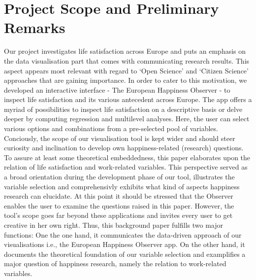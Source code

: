\documentclass[preprint,12pt,authoryear]{elsarticle}
\begin{document}
	\newpage
	\tableofcontents
	\newpage
	
	
	\section{Project Scope and Preliminary Remarks}
	Our project investigates life satisfaction across Europe and puts an emphasis on the data visualisation part that comes
	with communicating research results. This aspect appears most relevant with regard to `Open Science' and `Citizen
	Science' approaches that are gaining importance. In order to cater to this motivation, we developed an interactive interface
	- The European Happiness Observer - to inspect life satisfaction and its various antecedent across Europe. The app offers
	a myriad of possibilities to inspect life satisfaction on a descriptive basis or delve deeper by computing regression and multilevel
	analyses. Here, the user can select various options and combinations from a pre-selected pool of variables. \\
	Conciously, the scope of our visualisation tool is kept wider and should steer curiosity and inclination to develop own 
	happiness-related (research) questions. To assure at least some theoretical embeddedness, this paper elaborates upon the
	relation of life satisfaction and work-related variables. This perspective served as a broad orientation during the development
	phase of our tool, illustrates the variable selection and comprehensivly exhibits what kind of aspects happiness research
	can elucidate. At this point it should be stressed that the Observer enables the user to examine the questions raised in this
	paper. However, the tool's scope goes far beyond these applications and invites every user to get creative in her own 
	right. Thus, this background paper fulfills two major functions: One the one hand, it communicates the data-driven
	approach of our visualisations i.e., the European Happiness Observer app. On the other hand, it documents the theoretical foundation
	of our variable selection and examplifies a major question of happiness research, namely the relation to work-related
	variables.  
	
\end{document}
